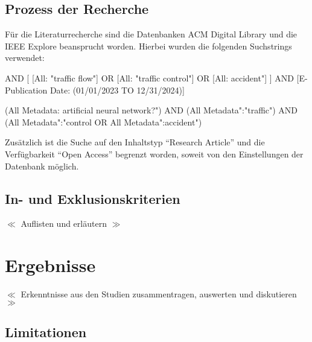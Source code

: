 \documentclass{scrartcl}
\begin{document}
\subsection{Prozess der Recherche}

Für die Literaturrecherche sind die Datenbanken ACM Digital Library und die IEEE Explore
beansprucht worden. Hierbei wurden die folgenden Suchstrings verwendet:

\begin{tcolorbox}
   AND [
         [All: "traffic flow"]
         OR [All: "traffic control"]
         OR [All: \dq accident"]
      ]
   AND [E-Publication Date: (01/01/2023 TO 12/31/2024)]
\end{tcolorbox}

\begin{tcolorbox}[
      enhanced,
      attach boxed title to top left,
      colback=gray!20,
      colframe=gray,
      colbacktitle=gray,
      title=IEEE Explore,
      fonttitle=\bfseries\color{black},
      boxed title style={size=small, colframe=gray, sharp corners},
      sharp corners
   ]
   (\dq All Metadata\dq: \dq artificial neural network?")
   AND (\dq All Metadata":"traffic")
   AND (\dq All Metadata":"control\dq\space
   OR \dq All Metadata":\dq accident")
\end{tcolorbox}

Zusätzlich ist die Suche auf den Inhaltstyp \enquote{Research Article}
und die Verfügbarkeit \enquote{Open Access} begrenzt worden, soweit von
den Einstellungen der Datenbank möglich.

\subsection{In- und Exklusionskriterien}

$\ll$ Auflisten und erläutern $\gg$

\section{Ergebnisse}

$\ll$ Erkenntnisse aus den Studien zusammentragen, auswerten und diskutieren $\gg$

\subsection{Limitationen}
\end{document}

